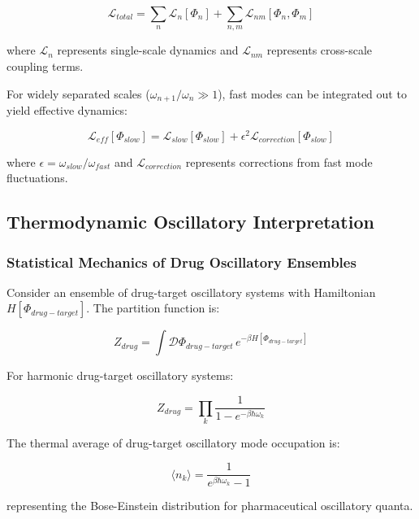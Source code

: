 \begin{equation}
\mathcal{L}_{total} = \sum_n \mathcal{L}_n[\Phi_n] + \sum_{n,m} \mathcal{L}_{nm}[\Phi_n, \Phi_m]
\end{equation}

where $\mathcal{L}_n$ represents single-scale dynamics and $\mathcal{L}_{nm}$ represents cross-scale coupling terms.

For widely separated scales ($\omega_{n+1}/\omega_n \gg 1$), fast modes can be integrated out to yield effective dynamics:

\begin{equation}
\mathcal{L}_{eff}[\Phi_{slow}] = \mathcal{L}_{slow}[\Phi_{slow}] + \epsilon^2 \mathcal{L}_{correction}[\Phi_{slow}]
\end{equation}

where $\epsilon = \omega_{slow}/\omega_{fast}$ and $\mathcal{L}_{correction}$ represents corrections from fast mode fluctuations.

\subsection{Thermodynamic Oscillatory Interpretation}

\subsubsection{Statistical Mechanics of Drug Oscillatory Ensembles}

Consider an ensemble of drug-target oscillatory systems with Hamiltonian $H[\Phi_{drug-target}]$. The partition function is:

\begin{equation}
Z_{drug} = \int \mathcal{D}\Phi_{drug-target} \, e^{-\beta H[\Phi_{drug-target}]}
\end{equation}

For harmonic drug-target oscillatory systems:

\begin{equation}
Z_{drug} = \prod_k \frac{1}{1 - e^{-\beta\hbar\omega_k}}
\end{equation}

The thermal average of drug-target oscillatory mode occupation is:

\begin{equation}
\langle n_k\rangle = \frac{1}{e^{\beta\hbar\omega_k} - 1}
\end{equation}

representing the Bose-Einstein distribution for pharmaceutical oscillatory quanta.

